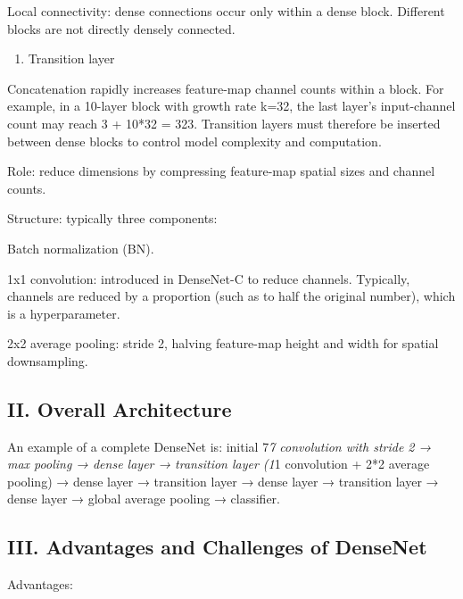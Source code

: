 Local connectivity: dense connections occur only within a dense block. Different blocks are not directly densely connected.

\begin{enumerate}
\def\labelenumi{\arabic{enumi}.}
\setcounter{enumi}{1}
\tightlist
\item
  Transition layer
\end{enumerate}

Concatenation rapidly increases feature-map channel counts within a block. For example, in a 10-layer block with growth rate k=32, the last layer's input-channel count may reach 3 + 10*32 = 323. Transition layers must therefore be inserted between dense blocks to control model complexity and computation.

Role: reduce dimensions by compressing feature-map spatial sizes and channel counts.

Structure: typically three components:

Batch normalization (BN).

1x1 convolution: introduced in DenseNet-C to reduce channels. Typically, channels are reduced by a proportion (such as to half the original number), which is a hyperparameter.

2x2 average pooling: stride 2, halving feature-map height and width for spatial downsampling.

\hypertarget{ii.-overall-architecture}{%
\subsection{II. Overall Architecture}\label{ii.-overall-architecture}}

An example of a complete DenseNet is: initial 7\emph{7 convolution with stride 2 → max pooling → dense layer → transition layer (1}1 convolution + 2*2 average pooling) → dense layer → transition layer → dense layer → transition layer → dense layer → global average pooling → classifier.

\hypertarget{iii.-advantages-and-challenges-of-densenet}{%
\subsection{III. Advantages and Challenges of DenseNet}\label{iii.-advantages-and-challenges-of-densenet}}

Advantages:

